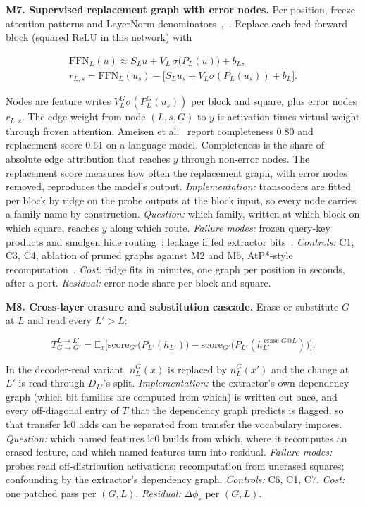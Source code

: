 \documentclass[conference]{IEEEtran}
\begin{document}
\textbf{M7. Supervised replacement graph with error nodes.} Per position, freeze attention patterns and LayerNorm denominators~\cite{ali2022},~\cite{ameisen2025}. Replace each feed-forward block (squared ReLU in this network) with

\[
\begin{gathered}\mathrm{FFN}_L(u)\approx S_Lu+V_L\,\sigma\big(P_L(u)\big)+b_L,\\
r_{L,s}=\mathrm{FFN}_L(u_s)-\big[S_Lu_s+V_L\sigma(P_L(u_s))+b_L\big].\end{gathered}
\]

Nodes are feature writes $V^G_L\sigma(P^G_L(u_s))$ per block and square, plus error nodes $r_{L,s}$. The edge weight from node $(L,s,G)$ to $y$ is activation times virtual weight through frozen attention. Ameisen et al.~\cite{ameisen2025} report completeness 0.80 and replacement score 0.61 on a language model. Completeness is the share of absolute edge attribution that reaches $y$ through non-error nodes. The replacement score measures how often the replacement graph, with error nodes removed, reproduces the model's output. \emph{Implementation:} transcoders are fitted per block by ridge on the probe outputs at the block input, so every node carries a family name by construction. \emph{Question:} which family, written at which block on which square, reaches $y$ along which route. \emph{Failure modes:} frozen query-key products and smolgen hide routing~\cite{jenner2024}; leakage if fed extractor bits~\cite{mahinpei2021}. \emph{Controls:} C1, C3, C4, ablation of pruned graphs against M2 and M6, AtP*-style recomputation~\cite{kramar2024}. \emph{Cost:} ridge fits in minutes, one graph per position in seconds, after a port. \emph{Residual:} error-node share per block and square.

\textbf{M8. Cross-layer erasure and substitution cascade.} Erase or substitute $G$ at $L$ and read every $L'>L$:

\[
T^{L\to L'}_{G\to G'}=\mathbb E_x\Big[\mathrm{score}_{G'}\big(P_{L'}(h_{L'})\big)-\mathrm{score}_{G'}\big(P_{L'}(h^{\,\text{erase }G@L}_{L'})\big)\Big].
\]

In the decoder-read variant, $n^G_L(x)$ is replaced by $n^G_L(x')$ and the change at $L'$ is read through $D_{L'}$'s split. \emph{Implementation:} the extractor's own dependency graph (which bit families are computed from which) is written out once, and every off-diagonal entry of $T$ that the dependency graph predicts is flagged, so that transfer lc0 adds can be separated from transfer the vocabulary imposes. \emph{Question:} which named features lc0 builds from which, where it recomputes an erased feature, and which named features turn into residual. \emph{Failure modes:} probes read off-distribution activations; recomputation from unerased squares; confounding by the extractor's dependency graph. \emph{Controls:} C6, C1, C7. \emph{Cost:} one patched pass per $(G,L)$. \emph{Residual:} $\Delta\phi_\varepsilon$ per $(G,L)$.
\end{document}
